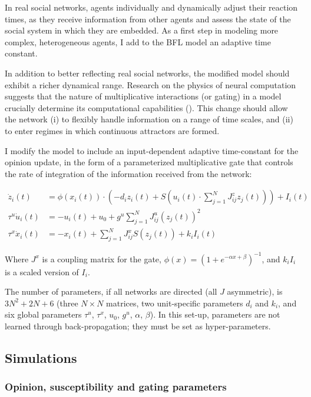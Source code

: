 \documentclass[]{article}
\begin{document}
In real social networks, agents individually and dynamically adjust their reaction times, as they receive information from other agents and assess the state of the social system in which they are embedded. As a first step in modeling more complex, heterogeneous agents, I add to the BFL model an adaptive time constant.

In addition to better reflecting real social networks, the modified model should exhibit a richer dynamical range. Research on the physics of neural computation suggests that the nature of multiplicative interactions (or gating) in a model crucially determine its computational capabilities (\cite{krishnamurthyTheoryGatingRecurrent2022}). This change should allow the network (i) to flexibly handle information on a range of time scales, and (ii) to enter regimes in which continuous attractors are formed. 

I modify the model to include an input-dependent adaptive time-constant for the opinion update, in the form of a parameterized multiplicative gate that controls the rate of integration of the information received from the network:

\begin{align}
	\dot{z}_{i}(t) &= \phi \left( x_i(t) \right) \cdot \left( -d_{i}z_{i}(t) + S \left( u_i(t) \cdot  \sum^{N}_{j=1} J^z_{ij}z_{j}(t)  \right) \right) + I_{i}(t) \\
	\tau^u \dot{u}_i(t) &=  -u_i(t)+u_0+g^u \sum ^{N}_{j=1} J^u_{ij}(z_{j}(t))^2 \\
	\tau^x \dot{x}_i(t) &= -x_i(t) +  \sum ^{N}_{j=1} J^x_{ij} S(z_j(t)) + k_i I_i(t)
\end{align}

Where $J^x$ is a coupling matrix for the gate, $\phi (x) = (1 + e^{- \alpha x + \beta })^{-1}$, and $k_i I_i$ is a scaled version of $I_i$.

The number of parameters, if all networks are directed (all $J$ asymmetric), is $3 N^2 + 2N + 6$ (three $N \times N$ matrices, two unit-specific parameters $d_i$ and $k_i$, and six global parameters $\tau^u$, $\tau^x$, $u_0$, $g^u$, $\alpha$, $\beta$). In this set-up, parameters are not learned through back-propagation; they must be set as hyper-parameters. 

\subsection{Simulations}

\subsubsection{Opinion, susceptibility and gating parameters}
\end{document}
